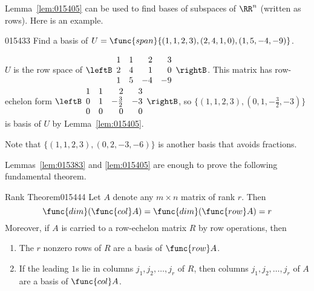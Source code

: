 Lemma~\ref{lem:015405} can be used to find bases of subspaces of $\RR^n$ (written as rows). Here is an example.

\begin{example}{}{015433}
Find a basis of $U = \func{span}\{(1, 1, 2, 3), (2, 4, 1, 0), (1, 5, -4, -9)\}$.

\begin{solution}
$U$ is the row space of $\leftB \begin{array}{rrrr}
1 & 1 & 2 & 3 \\
2 & 4 & 1 & 0 \\
1 & 5 & -4&-9
\end{array} \rightB$. This matrix has row-echelon form
$\leftB \begin{array}{rrrr}
1 & 1 & 2 & 3 \\
0 & 1 & -\frac{3}{2} & -3 \\
0 & 0 & 0 & 0
\end{array} \rightB$, so $\{(1, 1, 2, 3), (0, 1, - \frac{3}{2}, -3)\}$ is basis of $U$ by Lemma~\ref{lem:015405}.

Note that $\{(1, 1, 2, 3), (0, 2, -3, -6)\}$ is another basis that avoids fractions.
\end{solution}
\end{example}

Lemmas~\ref{lem:015383} and \ref{lem:015405} are enough to prove the following fundamental theorem.

\begin{theorem}{Rank Theorem}{015444} %
Let $A$ denote any $m \times n$ matrix of rank $r$. Then
\begin{equation*}
\func{dim}(\func{col }A ) = \func{dim} (\func{row } A) = r
\end{equation*}
Moreover, if $A$ is carried to a row-echelon matrix $R$ by row operations, then

\begin{enumerate}
\item The $r$ nonzero rows of $R$ are a basis of $\func{row} A$.

\item If the leading $1$s lie in columns $j_{1}, j_{2}, \dots, j_{r}$ of $R$, then columns $j_{1}, j_{2}, \dots, j_{r}$ of $A$ are a basis of $\func{col} A$.

\end{enumerate}
\end{theorem}

